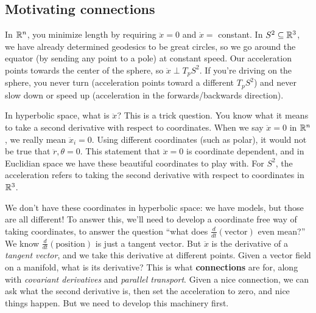 \subsection{Motivating connections}
In $\mathbb{R}^n $, you minimize length by requiring $\ddot x=0$ and $\dot x=$ constant. In $S ^2\subseteq \mathbb{R}^3$, we have already determined geodesics to be great circles, so we go around the equator (by sending any point to a pole) at constant speed. Our acceleration points towards the center of the sphere, so $\ddot x \perp T_pS^2$. If you're driving on the sphere, you never turn (acceleration points toward a different $T_pS^2$) and never slow down or speed up (acceleration in the forwards/backwards direction).

In hyperbolic space, what is $\ddot x$? This is a trick question. You know what it means to take a second derivative with respect to coordinates. When we say $\ddot x=0$ in $\mathbb{R}^n $, we really mean $\ddot x_i =0$. Using different coordinates (such as polar), it would not be true that $\ddot r,\theta=0$. This statement that $\ddot x=0$ is coordinate dependent, and in Euclidian space we have these beautiful coordinates to play with. For $S^2$, the acceleration refers to taking the second derivative with respect to coordinates in $\mathbb{R}^3$. 

We don't have these coordinates in hyperbolic space: we have models, but those are all different! To answer this, we'll need to develop a coordinate free way of taking coordinates, to answer the question ``what does $\frac{d}{dt}(\text{vector} )$ even mean?'' We know $\frac{d}{dt}(\text{position} )$ is just a tangent vector. But $\ddot x$ is the derivative of a \emph{tangent vector}, and we take this derivative at different points. Given a vector field on a manifold, what is its derivative? This is what \textbf{connections} are for, along with \emph{covariant derivatives} and \emph{parallel transport}. Given a nice connection, we can ask what the second derivative is, then set the acceleration to zero, and nice things happen. But we need to develop this machinery first.
